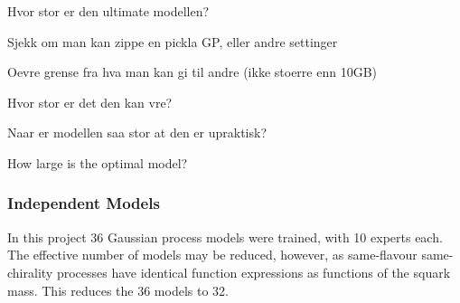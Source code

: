 \documentclass[twoside,english]{uiofysmaster}
\begin{document}
Hvor stor er den ultimate modellen?

Sjekk om man kan zippe en pickla GP, eller andre settinger

Oevre grense fra hva man kan gi til andre (ikke stoerre enn 10GB)

Hvor stor er det den kan vre?

Naar er modellen saa stor at den er upraktisk?




How large is the optimal model?

\subsubsection{Independent Models}

In this project 36 Gaussian process models were trained, with 10 experts each. The effective number of models may be reduced, however, as same-flavour same-chirality processes have identical function expressions as functions of the squark mass. This reduces the 36 models to 32.







\end{document}
